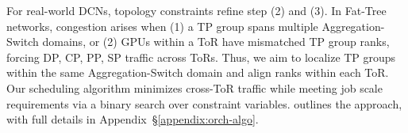 For real-world DCNs, topology constraints refine step (2) and (3). In Fat-Tree networks, congestion arises when (1) a TP group spans multiple Aggregation-Switch domains, or (2) GPUs within a ToR have mismatched TP group ranks, forcing DP, CP, PP, SP traffic across ToRs. Thus, we aim to localize TP groups within the same Aggregation-Switch domain and align ranks within each ToR. Our scheduling algorithm minimizes cross-ToR traffic while meeting job scale requirements via a binary search over constraint variables.  outlines the approach, with full details in Appendix~\S\ref{appendix:orch-algo}.  
